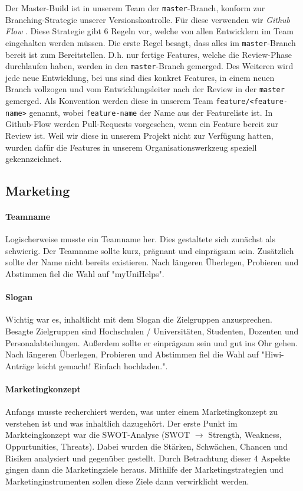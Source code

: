 \documentclass[12pt,a4paper]{scrartcl}
\newcommand{\code}[1]{\texttt{#1}}
\newcommand{\italic}[1]{\textit{#1}}
\begin{document}
Der Master-Build ist in unserem Team der \code{master}-Branch, konform zur Branching-Strategie unserer Versionskontrolle.
Für diese verwenden wir \italic{Github Flow} \cite{github-flow}.
Diese Strategie gibt 6 Regeln vor, welche von allen Entwicklern im Team eingehalten werden müssen.
Die erste Regel besagt, dass alles im \code{master}-Branch bereit ist zum Bereitstellen.
D.h. nur fertige Features, welche die Review-Phase durchlaufen haben, werden in den \code{master}-Branch gemerged.
Des Weiteren wird jede neue Entwicklung, bei uns sind dies konkret Features, in einem neuen Branch vollzogen und vom Entwicklungsleiter nach der Review in der \code{master} gemerged.
Als Konvention werden diese in unserem Team \code{feature/<feature-name>} genannt, wobei \code{feature-name} der Name aus der Featureliste ist.
In Github-Flow werden Pull-Requests vorgesehen, wenn ein Feature bereit zur Review ist.
Weil wir diese in unserem Projekt nicht zur Verfügung hatten, wurden dafür die Features in unserem Organisationswerkzeug speziell gekennzeichnet.

\subsection{Marketing}

\paragraph{Teamname}
Logischerweise musste ein Teamname her.
Dies gestaltete sich zunächst als schwierig.
Der Teamname sollte kurz, prägnant und einprägsam sein.
Zusätzlich sollte der Name nicht bereits existieren.
Nach längeren Überlegen, Probieren und Abstimmen fiel die Wahl auf "myUniHelps".

\paragraph{Slogan}
Wichtig war es, inhaltlicht mit dem Slogan die Zielgruppen anzusprechen. 
Besagte Zielgruppen sind Hochschulen / Universitäten, Studenten, Dozenten und Personalabteilungen.
Außerdem sollte er einprägsam sein und gut ins Ohr gehen.
Nach längeren Überlegen, Probieren und Abstimmen fiel die Wahl auf "Hiwi-Anträge leicht gemacht! Einfach hochladen.".

\paragraph{Marketingkonzept}
Anfangs musste recherchiert werden, was unter einem Marketingkonzept zu verstehen ist und was inhaltlich dazugehört.
Der erste Punkt im Markteingkonzept war die SWOT-Analyse (SWOT $\rightarrow$ Strength, Weakness, Oppurtunities, Threats).
Dabei wurden die Stärken, Schwächen, Chancen und Risiken analysiert und gegenüber gestellt. Durch Betrachtung dieser 4 Aspekte gingen dann die Marketingziele heraus.
Mithilfe der Marketingstrategien und Marketinginstrumenten sollen diese Ziele dann verwirklicht werden.
\end{document}
